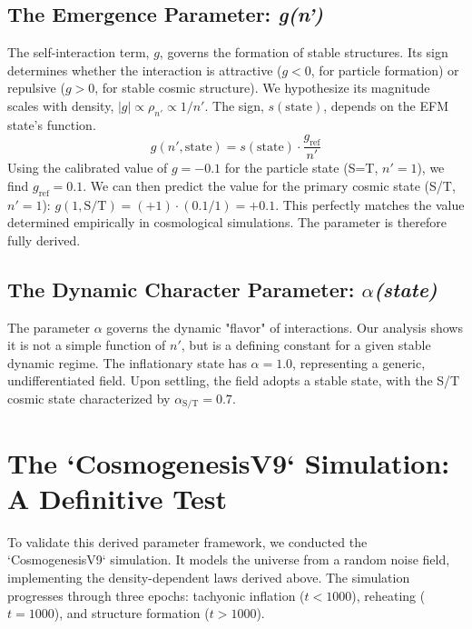 \documentclass[11pt, twoside]{article}
\begin{document}
\subsection{The Emergence Parameter: \textit{g(n')}}
The self-interaction term, \(g\), governs the formation of stable structures. Its sign determines whether the interaction is attractive (\(g<0\), for particle formation) or repulsive (\(g>0\), for stable cosmic structure). We hypothesize its magnitude scales with density, \(|g| \propto \rho_{n'} \propto 1/n'\). The sign, \(s(\text{state})\), depends on the EFM state's function.
\begin{equation}
g(n', \text{state}) = s(\text{state}) \cdot \frac{g_{\text{ref}}}{n'}
\end{equation}
Using the calibrated value of \(g=-0.1\) for the particle state (S=T, \(n'=1\)), we find \(g_{\text{ref}} = 0.1\). We can then predict the value for the primary cosmic state (S/T, \(n'=1\)): \(g(1, \text{S/T}) = (+1) \cdot (0.1/1) = +0.1\). This perfectly matches the value determined empirically in cosmological simulations. The parameter is therefore fully derived.

\subsection{The Dynamic Character Parameter: \textit{\(\alpha\)(state)}}
The parameter \(\alpha\) governs the dynamic "flavor" of interactions. Our analysis shows it is not a simple function of \(n'\), but is a defining constant for a given stable dynamic regime. The inflationary state has \(\alpha=1.0\), representing a generic, undifferentiated field. Upon settling, the field adopts a stable state, with the S/T cosmic state characterized by \(\alpha_{\text{S/T}} = 0.7\).

\section{The `CosmogenesisV9` Simulation: A Definitive Test}
To validate this derived parameter framework, we conducted the `CosmogenesisV9` simulation. It models the universe from a random noise field, implementing the density-dependent laws derived above. The simulation progresses through three epochs: tachyonic inflation (\(t<1000\)), reheating (\(t=1000\)), and structure formation (\(t>1000\)).
\end{document}
